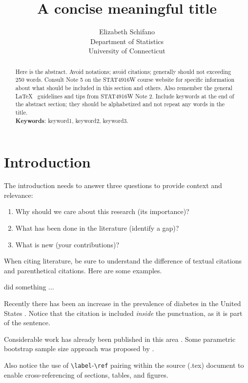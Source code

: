 \documentclass[12pt]{article}
\title{A concise meaningful title}
\author{Elizabeth Schifano\\
  Department of Statistics\\
  University of Connecticut
}
\begin{document}
\maketitle

\begin{abstract}
Here is the abstract.  
Avoid notations; avoid citations; generally should not exceeding 250 words. 
Consult Note 5 on the STAT4916W course website for specific information about 
what should be included in this section and others.  Also remember the general 
\LaTeX\mbox{ } guidelines and tips from STAT4916W Note 2. 
Include keywords at the end of the abstract section; they should be 
alphabetized and not repeat any words in the title.\\

\noindent\textbf{Keywords}: keyword1, keyword2, keyword3.
\end{abstract}


\section{Introduction}
\label{sec:intro}

The introduction needs to answer three questions to provide context and 
relevance:
\begin{enumerate}
\item Why should we care about this research (its importance)?
\item What has been done in the literature (identify a gap)?
\item What is new (your contributions)?
\end{enumerate}


When citing literature, be sure to understand the difference of
textual citations and parenthetical citations.  Here are some examples. 

\citet{xie2015dynamic} did something ...  


Recently there has been an increase in the prevalence of diabetes in the United 
States \citep{wild2004global}. Notice that the citation is included 
\textit{inside} the punctuation, as it is part of the sentence. 


Considerable work has already been published in this area 
\citep[e.g.,][]{xie2015dynamic}. Some parametric bootstrap sample size 
approach was proposed by \citet{dwivedi2017analysis}. 


Also notice the use of \verb|\label|-\verb|\ref| pairing within the source 
(.tex) document to enable cross-referencing of sections, tables, and figures.
\end{document}
